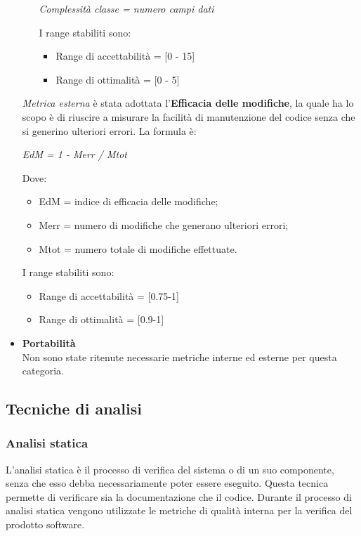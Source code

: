 \begin{itemize}
\begin{itemize}
\begin{center}
              \emph{Complessità classe = numero campi dati}
            \end{center}
            I range stabiliti sono:
            \begin{itemize}
              \item Range di accettabilità = [0 - 15]
              \item Range di ottimalità = [0 - 5]
            \end{itemize}
        \end{itemize}
        \emph{Metrica esterna} è stata adottata l'\textbf{Efficacia delle modifiche},
        la quale ha lo scopo è di riuscire a misurare la facilità di manutenzione del codice senza che si generino ulteriori errori.
        La formula è:
        \begin{center}
          \emph{EdM = 1 - Merr / Mtot}
        \end{center}
        Dove:
        \begin{itemize}
          \item EdM = indice di efficacia delle modifiche;
          \item Merr = numero di modifiche che generano ulteriori errori;
          \item Mtot = numero totale di modifiche effettuate.
        \end{itemize}
        I range stabiliti sono:
        \begin{itemize}
          \item Range di accettabilità = [0.75-1]
          \item Range di ottimalità = [0.9-1]
        \end{itemize}
      \item \textbf{Portabilità}\\
      Non sono state ritenute necessarie metriche interne ed esterne per questa categoria.
    \end{itemize}



  \subsection{Tecniche di analisi}
    \subsubsection{Analisi statica}
    L'analisi statica è il processo di verifica del sistema o di un suo componente, senza che esso debba necessariamente poter essere eseguito.
    Questa tecnica permette di verificare sia la documentazione che il codice.
    Durante il processo di analisi statica vengono utilizzate le metriche di qualità interna per la verifica del prodotto software.
